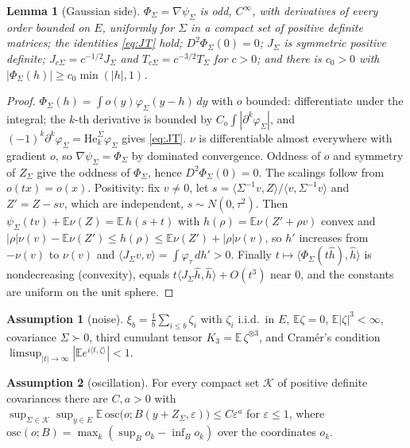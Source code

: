 \documentclass[10pt]{article}
\newtheorem{lemma}[theorem]{Lemma}
\theoremstyle{definition}
\newtheorem{assumption}{Assumption}
\theoremstyle{remark}
\newcommand{\E}{\mathbb{E}}
\newcommand{\inner}[2]{\langle #1, #2\rangle}
\newcommand{\He}{\mathrm{He}}
\begin{document}
\begin{lemma}[Gaussian side]\label{lem:gauss}
$\Phi_\Sigma=\nabla\psi_\Sigma$ is odd, $C^\infty$, with derivatives of every order bounded on $E$, uniformly for
$\Sigma$ in a compact set of positive definite matrices; the identities \eqref{eq:JT} hold; $D^2\Phi_\Sigma(0)=0$;
$J_\Sigma$ is symmetric positive definite; $J_{c\Sigma}=c^{-1/2}J_\Sigma$ and $T_{c\Sigma}=c^{-3/2}T_\Sigma$ for $c>0$;
and there is $c_0>0$ with $|\Phi_\Sigma(h)|\ge c_0\min(|h|,1)$.
\end{lemma}
\begin{proof}
$\Phi_\Sigma(h)=\int o(y)\varphi_\Sigma(y-h)\,dy$ with $o$ bounded: differentiate under the integral; the $k$-th
derivative is bounded by $C_o\int|\partial^k\varphi_\Sigma|$, and $(-1)^k\partial^k\varphi_\Sigma=\He_k^\Sigma\varphi_\Sigma$
gives \eqref{eq:JT}. $\nu$ is differentiable almost everywhere with gradient $o$, so $\nabla\psi_\Sigma=\Phi_\Sigma$ by
dominated convergence. Oddness of $o$ and symmetry of $Z_\Sigma$ give the oddness of $\Phi_\Sigma$, hence
$D^2\Phi_\Sigma(0)=0$. The scalings follow from $o(tx)=o(x)$. Positivity: fix $v\ne0$, let
$s=\inner{\Sigma^{-1}v}{Z}/\inner v{\Sigma^{-1}v}$ and $Z'=Z-sv$, which are independent, $s\sim N(0,\tau^2)$. Then
$\psi_\Sigma(tv)+\E\nu(Z)=\E\,h(s+t)$ with $h(\rho)=\E\nu(Z'+\rho v)$ convex and
$|\rho|\nu(v)-\E\nu(Z')\le h(\rho)\le\E\nu(Z')+|\rho|\nu(v)$, so $h'$ increases from $-\nu(v)$ to $\nu(v)$ and
$\inner{J_\Sigma v}v=\int\varphi_\tau\,dh'>0$. Finally $t\mapsto\inner{\Phi_\Sigma(t\hat h)}{\hat h}$ is nondecreasing
(convexity), equals $t\inner{J_\Sigma\hat h}{\hat h}+O(t^3)$ near $0$, and the constants are uniform on the unit sphere.
\end{proof}

\begin{assumption}[noise]\label{ass:N}
$\xi_b=\frac1b\sum_{i\le b}\zeta_i$ with $\zeta_i$ i.i.d.\ in $E$, $\E\zeta=0$, $\E|\zeta|^3<\infty$, covariance
$\Sigma\succ0$, third cumulant tensor $K_3=\E\,\zeta^{\otimes3}$, and Cram\'er's condition
$\limsup_{|t|\to\infty}|\E e^{i\inner t\zeta}|<1$.
\end{assumption}
\begin{assumption}[oscillation]\label{ass:O}
For every compact set $\mathcal K$ of positive definite covariances there are $C,a>0$ with
$\sup_{\Sigma\in\mathcal K}\sup_{y\in E}\E\,\mathrm{osc}\big(o;B(y+Z_\Sigma,\varepsilon)\big)\le C\varepsilon^a$ for
$\varepsilon\le1$, where $\mathrm{osc}(o;B)=\max_{k}(\sup_Bo_k-\inf_Bo_k)$ over the coordinates $o_k$.
\end{assumption}
\end{document}

